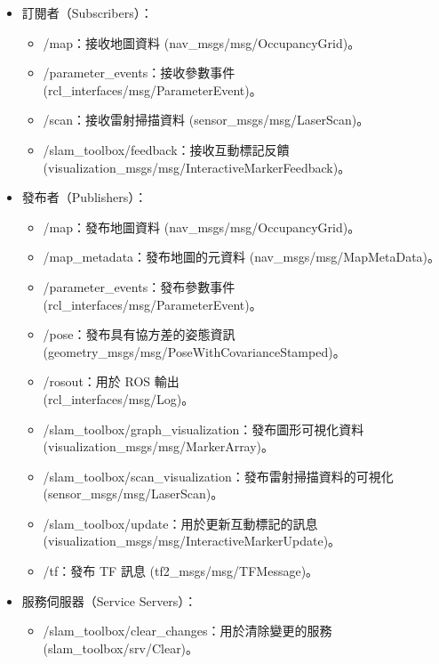 \begin{itemize}
    \item 訂閱者（Subscribers）：
    \begin{itemize}
        \item /map：接收地圖資料 (nav\_msgs/msg/OccupancyGrid)。
        \item /parameter\_events：接收參數事件 (rcl\_interfaces/msg/ParameterEvent)。
        \item /scan：接收雷射掃描資料 (sensor\_msgs/msg/LaserScan)。
        \item /slam\_toolbox/feedback：接收互動標記反饋 \\
            (visualization\_msgs/msg/InteractiveMarkerFeedback)。
    \end{itemize}
    \item 發布者（Publishers）：
    \begin{itemize}
        \item /map：發布地圖資料 (nav\_msgs/msg/OccupancyGrid)。
        \item /map\_metadata：發布地圖的元資料 (nav\_msgs/msg/MapMetaData)。
        \item /parameter\_events：發布參數事件 (rcl\_interfaces/msg/ParameterEvent)。
        \item /pose：發布具有協方差的姿態資訊 (geometry\_msgs/msg/PoseWithCovarianceStamped)。
        \item /rosout：用於 ROS 輸出 \\
            (rcl\_interfaces/msg/Log)。
        \item /slam\_toolbox/graph\_visualization：發布圖形可視化資料\\
            (visualization\_msgs/msg/MarkerArray)。
        \item /slam\_toolbox/scan\_visualization：發布雷射掃描資料的可視化 (sensor\_msgs/msg/LaserScan)。
        \item /slam\_toolbox/update：用於更新互動標記的訊息 
            \\(visualization\_msgs/msg/InteractiveMarkerUpdate)。
        \item /tf：發布 TF 訊息 (tf2\_msgs/msg/TFMessage)。
    \end{itemize}
    \item 服務伺服器（Service Servers）：
    \begin{itemize}
        \item /slam\_toolbox/clear\_changes：用於清除變更的服務 \\
            (slam\_toolbox/srv/Clear)。

\end{itemize}
\end{itemize}
